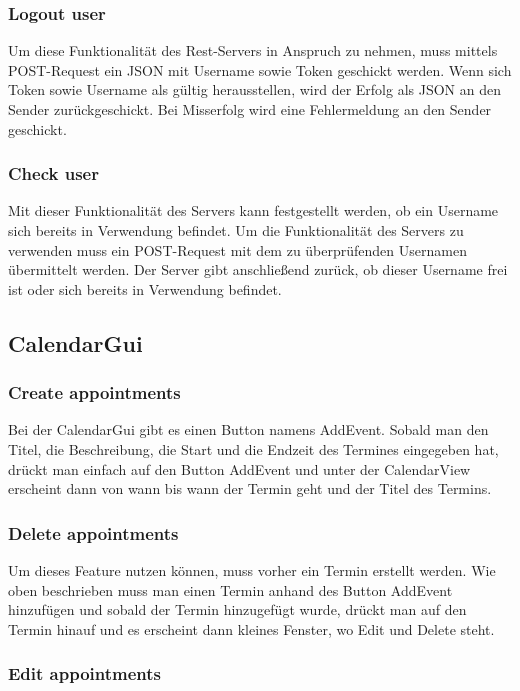 \documentclass[12pt]{scrartcl}
\begin{document}
    \subsubsection{Logout user}
        Um diese Funktionalität des Rest-Servers in Anspruch zu nehmen, muss mittels POST-Request ein JSON mit Username 
        sowie Token geschickt werden. Wenn sich Token sowie Username als gültig herausstellen, wird 
        der Erfolg als JSON an den Sender zurückgeschickt. Bei Misserfolg wird eine Fehlermeldung an den Sender 
        geschickt.
    \subsubsection{Check user}
        Mit dieser Funktionalität des Servers kann festgestellt werden, ob ein Username sich bereits in Verwendung 
        befindet. Um die Funktionalität des Servers zu verwenden muss ein POST-Request mit dem zu überprüfenden 
        Usernamen übermittelt werden.
        Der Server gibt anschließend zurück, ob dieser Username frei ist oder sich bereits in Verwendung befindet.

    \subsection{CalendarGui}
    \subsubsection{Create appointments}
        Bei der CalendarGui gibt es einen Button namens AddEvent. Sobald man den Titel, die Beschreibung, die Start und
        die Endzeit des Termines eingegeben hat, drückt man einfach auf den Button AddEvent und unter der CalendarView erscheint
        dann von wann bis wann der Termin geht und der Titel des Termins.
        
    \subsubsection{Delete appointments}
        Um dieses Feature nutzen können, muss vorher ein Termin erstellt werden. Wie oben beschrieben muss man einen Termin
        anhand des Button AddEvent hinzufügen und sobald der Termin hinzugefügt wurde, drückt man auf den Termin hinauf und
        es erscheint dann kleines Fenster, wo Edit und Delete steht.    
        
    \subsubsection{Edit appointments}
            
\end{document}

